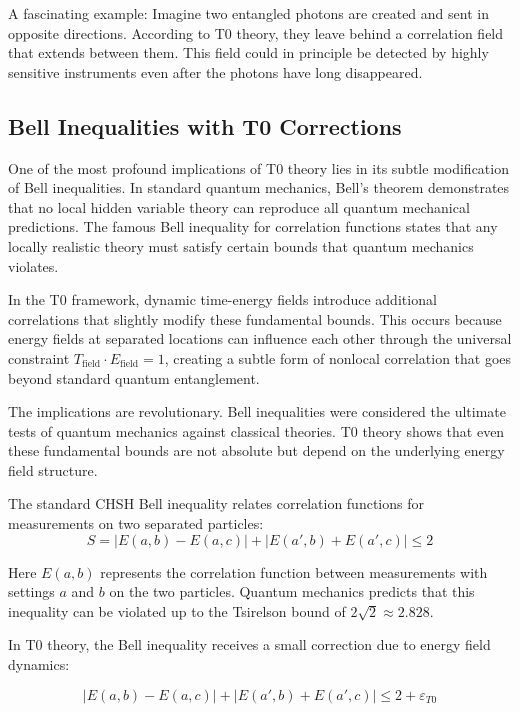 \documentclass[12pt,a4paper]{article}
\theoremstyle{definition}
\theoremstyle{remark}
\begin{document}
A fascinating example: Imagine two entangled photons are created and sent in opposite directions. According to T0 theory, they leave behind a correlation field that extends between them. This field could in principle be detected by highly sensitive instruments even after the photons have long disappeared.

\subsection{Bell Inequalities with T0 Corrections}

One of the most profound implications of T0 theory lies in its subtle modification of Bell inequalities. In standard quantum mechanics, Bell's theorem demonstrates that no local hidden variable theory can reproduce all quantum mechanical predictions. The famous Bell inequality for correlation functions states that any locally realistic theory must satisfy certain bounds that quantum mechanics violates.

In the T0 framework, dynamic time-energy fields introduce additional correlations that slightly modify these fundamental bounds. This occurs because energy fields at separated locations can influence each other through the universal constraint $T_{\text{field}} \cdot E_{\text{field}} = 1$, creating a subtle form of nonlocal correlation that goes beyond standard quantum entanglement.

The implications are revolutionary. Bell inequalities were considered the ultimate tests of quantum mechanics against classical theories. T0 theory shows that even these fundamental bounds are not absolute but depend on the underlying energy field structure.

The standard CHSH Bell inequality relates correlation functions for measurements on two separated particles:
\begin{equation}
	S = |E(a,b) - E(a,c)| + |E(a',b) + E(a',c)| \leq 2
	\label{eq:standard_bell}
\end{equation}

Here $E(a,b)$ represents the correlation function between measurements with settings $a$ and $b$ on the two particles. Quantum mechanics predicts that this inequality can be violated up to the Tsirelson bound of $2\sqrt{2} \approx 2.828$.

In T0 theory, the Bell inequality receives a small correction due to energy field dynamics:

\begin{equation}
	\boxed{|E(a,b) - E(a,c)| + |E(a',b) + E(a',c)| \leq 2 + \varepsilon_{T0}}
	\label{eq:modified_bell}
\end{equation}
\end{document}
